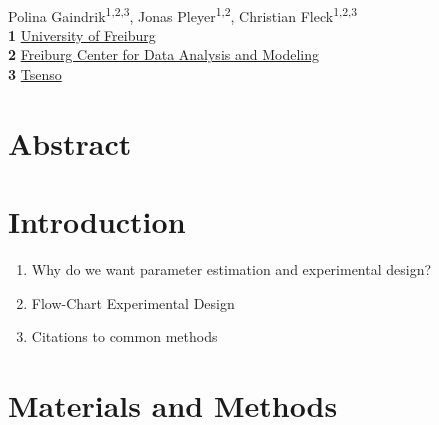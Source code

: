 \documentclass[10pt,A4paper]{article}
\begin{document}
\vspace*{0.2in}
\begin{flushleft}
{\Large
\textbf{}}
\newline
\\
Polina Gaindrik\textsuperscript{1,2,3},
Jonas Pleyer\textsuperscript{1,2},
Christian Fleck\textsuperscript{1,2,3}
\\
\bigskip
\textbf{1} \href{https://www.fdm.uni-freiburg.de/spatsysbio}{University of Freiburg}\\
\textbf{2} \href{https://www.fdm.uni-freiburg.de/spatsysbio}{Freiburg Center for Data Analysis and Modeling}\\
\textbf{3} \href{https://tsenso.com/en/}{Tsenso}\\
\bigskip

\end{flushleft}
\section*{Abstract}
%
%
%
\linenumbers
%
%
%
\section*{Introduction}
%
\begin{enumerate}
	\item Why do we want parameter estimation and experimental design?
	\item Flow-Chart Experimental Design
	\item Citations to common methods
\end{enumerate}
%
%
%
\section*{Materials and Methods}
%
%
\end{document}
